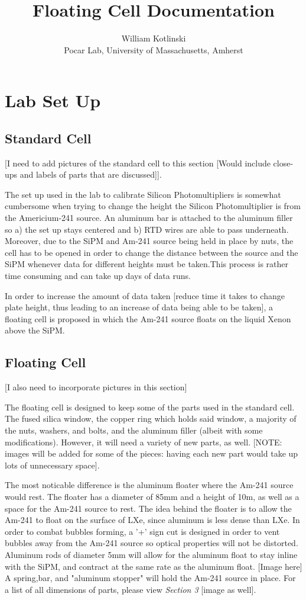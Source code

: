 \documentclass{article}%
\title{Floating Cell Documentation}
\date{\day}
\author{William Kotlinski\\Pocar Lab, University of Massachusetts, Amherst}
\begin{document}
\maketitle
\newpage
\tableofcontents
\newpage
\section{Lab Set Up}
\subsection{Standard Cell}
[I need to add pictures of the standard cell to this section [Would include close-ups and labels of parts that are discussed]].

The set up used in the lab to calibrate Silicon Photomultipliers is somewhat cumbersome when trying to change the height the Silicon Photomultiplier is from the Americium-241 source. An aluminum bar is attached to the aluminum filler so a) the set up stays centered and b) RTD wires are able to pass underneath. Moreover, due to the SiPM and Am-241 source being held in place by nuts, the cell has to be opened in order to change the distance between the source and the SiPM whenever data for different heights must be taken.This process is rather time consuming and can take up days of data runs. 

In order to increase the amount of data taken [reduce time it takes to change plate height, thus leading to an increase of data being able to be taken], a floating cell is proposed in which the Am-241 source floats on the liquid Xenon above the SiPM.
\subsection{Floating Cell}
[I also need to incorporate pictures in this section]

The floating cell is designed to keep some of the parts used in the standard cell. The fused silica window, the copper ring which holds said window,  a majority of the nuts, washers, and bolts, and the aluminum filler (albeit with some modifications). However, it will need a variety of new parts, as well. [NOTE: images will be added for some of the pieces: having each new part would take up lots of unnecessary space]. 

The most noticable difference is the aluminum floater where the Am-241 source would rest. The floater has a diameter of 85mm and a height of 10m, as well as a space for the Am-241 source to rest. The idea behind the floater is to allow the Am-241 to float on the surface of LXe, since aluminum is less dense than LXe. In order to combat bubbles forming, a '+' sign cut is designed in order to vent bubbles away from the Am-241 source so optical properties will not be distorted. Aluminum rods of diameter 5mm will allow for the aluminum float to stay inline with the SiPM, and contract at the same rate as the aluminum float. [Image here] A spring,bar, and "aluminum stopper" will hold the Am-241 source in place. For a list of all dimensions of parts, please view \textit{Section 3} [image as well]. 
\end{document}

